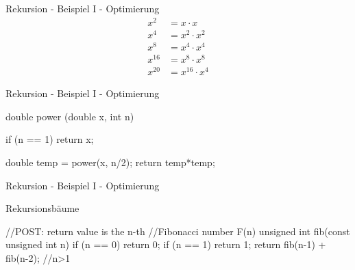 \ifnum\conditionmacro=1 \documentclass[handout,usenames,dvipsnames]{beamer}\fi
\begin{document}
\begin{frame}{Rekursion - Beispiel I - Optimierung}
\begin{align*}
x^2 &= x\cdot x\\
x^4 &= x^2\cdot x^2\\
x^8 &= x^4\cdot x^4\\
x^{16} &= x^8 \cdot x^8\\
x^{20} &= x^{16}\cdot x^4
\end{align*}
\end{frame}


\begin{frame}[fragile]{Rekursion - Beispiel I - Optimierung}
\begin{TFCpp}
double power (double x, int n){
	if (n == 1){
		return x;
	}

double temp = power(x, n/2);
return temp*temp;
}
\end{TFCpp}
\end{frame}


\begin{frame}[fragile]{Rekursion - Beispiel I - Optimierung}
\end{frame}

\begin{frame}[fragile]{Rekursionsbäume}
\begin{TFCpp}
//POST: return value is the n-th
//Fibonacci number F(n)
unsigned int fib(const unsigned int n){
	if (n == 0) return 0;
	if (n == 1) return 1;
	return fib(n-1) + fib(n-2); //n>1
}
\end{TFCpp}
\end{frame}
\end{document}
